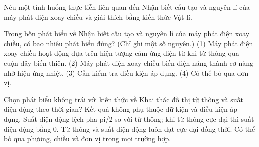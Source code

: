 \begin{bt}
Nêu một tình huống thực tiễn liên quan đến Nhận biết cấu tạo và nguyên lí của máy phát điện xoay chiều và giải thích bằng kiến thức Vật lí.
\end{bt}

\begin{ex}
Trong bốn phát biểu về Nhận biết cấu tạo và nguyên lí của máy phát điện xoay chiều, có bao nhiêu phát biểu đúng? (Chỉ ghi một số nguyên.) (1) Máy phát điện xoay chiều hoạt động dựa trên hiện tượng cảm ứng điện từ khi từ thông qua cuộn dây biến thiên. (2) Máy phát điện xoay chiều biến điện năng thành cơ năng nhờ hiệu ứng nhiệt. (3) Cần kiểm tra điều kiện áp dụng. (4) Có thể bỏ qua đơn vị.
\end{ex}

\begin{ex}
Chọn phát biểu không trái với kiến thức về Khai thác đồ thị từ thông và suất điện động theo thời gian?
\choice
{Kết quả không phụ thuộc dữ kiện và điều kiện áp dụng.}
{\True Suất điện động lệch pha pi/2 so với từ thông; khi từ thông cực đại thì suất điện động bằng 0.}
{Từ thông và suất điện động luôn đạt cực đại đồng thời.}
{Có thể bỏ qua phương, chiều và đơn vị trong mọi trường hợp.}
\end{ex}

